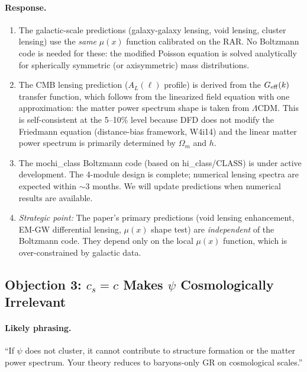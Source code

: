 \documentclass[11pt,a4paper]{article}
\newcommand{\LCDM}{$\Lambda$CDM}
\newcommand{\Geff}{G_{\rm eff}}
\begin{document}
\paragraph{Response.}
\begin{enumerate}[label=(\alph*)]
\item The galactic-scale predictions (galaxy-galaxy lensing, void lensing,
  cluster lensing) use the \emph{same} $\mu(x)$ function calibrated on the RAR.
  No Boltzmann code is needed for these: the modified Poisson equation is solved
  analytically for spherically symmetric (or axisymmetric) mass distributions.

\item The CMB lensing prediction ($A_L(\ell)$ profile) is derived from the
  $\Geff(k)$ transfer function, which follows from the linearized field equation
  with one approximation: the matter power spectrum shape is taken from \LCDM.
  This is self-consistent at the 5--10\% level because DFD does not modify the
  Friedmann equation (distance-bias framework, W4i14) and the linear matter
  power spectrum is primarily determined by $\Omega_m$ and $h$.

\item The mochi\_class Boltzmann code (based on hi\_class/CLASS) is under
  active development.  The 4-module design is complete; numerical lensing
  spectra are expected within $\sim 3$ months.  We will update predictions
  when numerical results are available.

\item \emph{Strategic point:} The paper's primary predictions (void lensing
  enhancement, EM-GW differential lensing, $\mu(x)$ shape test) are
  \emph{independent} of the Boltzmann code.  They depend only on the local
  $\mu(x)$ function, which is over-constrained by galactic data.
\end{enumerate}

\subsection{Objection 3: $c_s = c$ Makes $\psi$ Cosmologically Irrelevant}

\paragraph{Likely phrasing.}
``If $\psi$ does not cluster, it cannot contribute to structure formation
or the matter power spectrum. Your theory reduces to baryons-only GR on
cosmological scales.''
\end{document}
